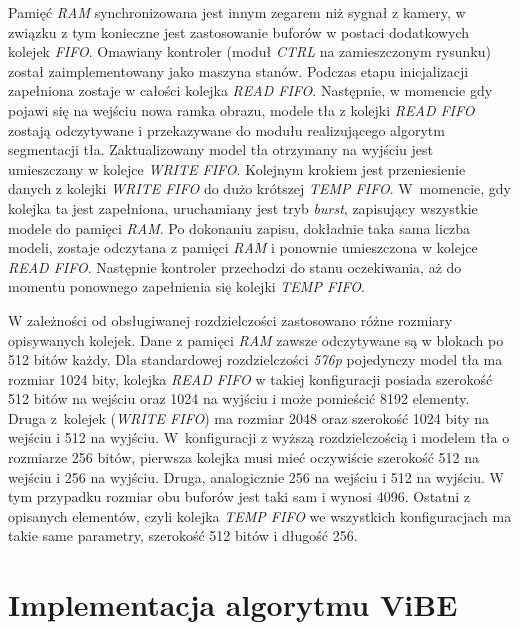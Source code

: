 Pamięć \textit{RAM} synchronizowana jest innym zegarem niż sygnał z kamery, w związku z tym konieczne jest zastosowanie buforów w postaci dodatkowych kolejek \textit{FIFO}. %
Omawiany kontroler (moduł \textit{CTRL} na zamieszczonym rysunku) został zaimplementowany jako maszyna stanów. %
Podczas etapu inicjalizacji zapełniona zostaje w całości kolejka \textit{READ FIFO}. 
Następnie, w momencie gdy pojawi się na wejściu nowa ramka obrazu, modele tła z kolejki \textit{READ FIFO} zostają odczytywane i przekazywane do modułu realizującego algorytm segmentacji tła. 
Zaktualizowany model tła otrzymany na wyjściu jest umieszczany w kolejce \textit{WRITE FIFO}. 
Kolejnym krokiem jest przeniesienie danych z kolejki \textit{WRITE FIFO} do dużo krótszej \textit{TEMP FIFO}. 
W~momencie, gdy kolejka ta jest zapełniona, uruchamiany jest tryb \textit{burst}, zapisujący wszystkie modele do pamięci \textit{RAM}. 
Po dokonaniu zapisu, dokładnie taka sama liczba modeli, zostaje odczytana z pamięci \textit{RAM} i ponownie umieszczona w kolejce \textit{READ FIFO}. 
Następnie kontroler przechodzi do stanu oczekiwania, aż do momentu ponownego zapełnienia się kolejki \textit{TEMP FIFO}. 

W zależności od obsługiwanej rozdzielczości zastosowano różne rozmiary opisywanych kolejek. Dane z pamięci \textit{RAM} zawsze odczytywane są w blokach po \num{512} bitów każdy. Dla standardowej rozdzielczości \textit{576p} pojedynczy model tła ma rozmiar \num{1024} bity, kolejka \textit{READ FIFO} w takiej konfiguracji posiada szerokość \num{512} bitów na wejściu oraz \num{1024} na wyjściu i może pomieścić \num{8192} elementy. Druga z~kolejek (\textit{WRITE FIFO}) ma rozmiar \num{2048} oraz szerokość \num{1024} bity na wejściu i \num{512} na wyjściu. W~konfiguracji z wyższą rozdzielczością i modelem tła o rozmiarze \num{256} bitów, pierwsza kolejka musi mieć oczywiście szerokość \num{512} na wejściu i \num{256} na wyjściu. Druga, analogicznie \num{256} na wejściu i \num{512} na wyjściu. W tym przypadku rozmiar obu buforów jest taki sam i wynosi \num{4096}. Ostatni z opisanych elementów, czyli kolejka \textit{TEMP FIFO} we wszystkich konfiguracjach ma takie same parametry, szerokość \num{512} bitów i długość \num{256}.



\section{Implementacja algorytmu ViBE}
\label{sec:fpga_vibe}

